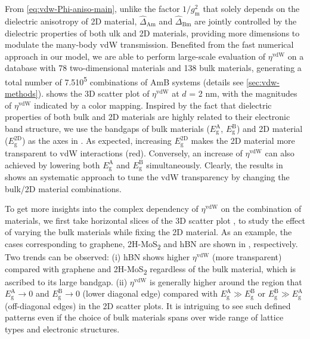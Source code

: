 From \autoref{eq:vdw-Phi-aniso-main}, unlike the factor
\(1/g_{\mathrm{m}}^{2}\) that solely depends on the dielectric
anisotropy of 2D material, \(\hat{\Delta}_{\mathrm{Am}}\) and
\(\hat{\Delta}_{\mathrm{Bm}}\) are jointly controlled by the
dielectric properties of both ulk and 2D materials, providing more
dimensions to modulate the many-body vdW transmission.
%
Benefited from
the fast numerical approach in our model, we are able to perform
large-scale evaluation of $\eta^{\mathrm{vdW}}$ on a database with
78 two-dimensional materials and 138 bulk materials, generating a total number of
7.5\texttimes{}10\textsuperscript{5} combinations of AmB systems
(details see \autoref{sec:vdw-methods}).
%
 shows the 3D scatter plot of
\(\eta^{\mathrm{vdW}}\) at \(d\) = 2 nm, with the magnitudes of
$\eta^{\mathrm{vdW}}$ indicated by a color mapping. Inspired by the
fact that dielectric properties of both bulk \cite{Moss_1950} and 2D
materials  are highly related to their
electronic band structure, we use the bandgaps of bulk materials
(\(E_{\mathrm{g}}^{\mathrm{A}}\), \(E_{\mathrm{g}}^{\mathrm{B}}\)) and
2D material (\(E_{\mathrm{g}}^{\mathrm{2D}}\)) as the axes in
 .
%
As expected, increasing
\(E_{\mathrm{g}}^{\mathrm{2D}}\) makes the 2D material more
transparent to vdW interactions (red).
%
Conversely, an increase of \(\eta^{\mathrm{vdW}}\) can also achieved
by lowering both \(E_{\mathrm{g}}^{\mathrm{A}}\) and
\(E_{\mathrm{g}}^{\mathrm{B}}\) simultaneously.
%
Clearly, the results in  shows an systematic
approach to tune the vdW transparency by changing the bulk/2D material
combinations.


To get more insights into the complex dependency of
\(\eta^{\mathrm{vdW}}\) on the combination of materials, we first take
horizontal slices of the 3D scatter plot , to
study the effect of varying the bulk materials while fixing the 2D
material.
%
As an example, the cases corresponding to graphene,
2H-MoS\textsubscript{2} and hBN are shown in , respectively.
%
Two trends can be observed: (i) hBN shows higher $\eta^{\mathrm{vdW}}$
(more transparent) compared with graphene and 2H-MoS\textsubscript{2}
regardless of the bulk material, which is ascribed to its large
bandgap. (ii) $\eta^{\mathrm{vdW}}$ is generally higher around the
region that \(E_{\mathrm{g}}^{\mathrm{A}} \to 0\) and
\(E_{\mathrm{g}}^{\mathrm{B}} \to 0\) (lower diagonal edge) compared
with \(E_{\mathrm{g}}^{\mathrm{A}} \gg E_{\mathrm{g}}^{\mathrm{B}}\)
or \(E_{\mathrm{g}}^{\mathrm{B}} \gg E_{\mathrm{g}}^{\mathrm{A}}\)
(off-diagonal edges) in the 2D scatter plots.
%
It is intriguing to see such defined patterns even
if the choice of bulk materials spans over wide range of lattice types
and electronic structures.

